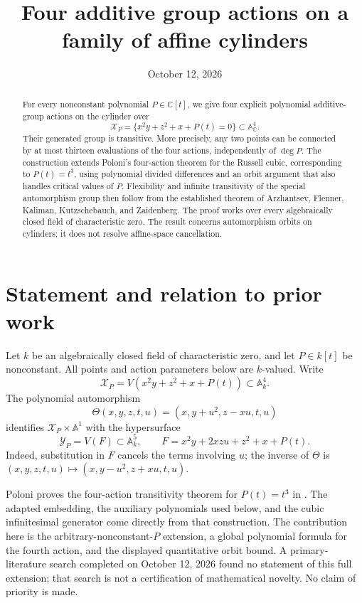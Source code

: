 \documentclass[11pt,letterpaper]{article}
\title{Four additive group actions on a family of affine cylinders}
\author{}
\date{October 12, 2026}
\newcommand{\A}{\mathbb A}
\newcommand{\C}{\mathbb C}
\newcommand{\Y}{\mathcal Y_P}
\newcommand{\X}{\mathcal X_P}
\theoremstyle{remark}
\begin{document}
\maketitle
\vspace{-0.4em}
\begin{abstract}
For every nonconstant polynomial $P\in\C[t]$, we give four explicit polynomial additive-group actions on the cylinder over
\[
\mathcal X_P=\{x^2y+z^2+x+P(t)=0\}\subset\A^4_{\C}.
\]
Their generated group is transitive. More precisely, any two points can be connected by at most thirteen evaluations of the four actions, independently of $\deg P$. The construction extends Poloni's four-action theorem for the Russell cubic, corresponding to $P(t)=t^3$, using polynomial divided differences and an orbit argument that also handles critical values of $P$. Flexibility and infinite transitivity of the special automorphism group then follow from the established theorem of Arzhantsev, Flenner, Kaliman, Kutzschebauch, and Zaidenberg. The proof works over every algebraically closed field of characteristic zero. The result concerns automorphism orbits on cylinders; it does not resolve affine-space cancellation.
\end{abstract}

\section{Statement and relation to prior work}

Let $k$ be an algebraically closed field of characteristic zero, and let $P\in k[t]$ be nonconstant. All points and action parameters below are $k$-valued. Write
\[
\X=V(x^2y+z^2+x+P(t))\subset\A^4_k.
\]
The polynomial automorphism
\begin{equation}\label{eq:theta}
\Theta(x,y,z,t,u)=(x,y+u^2,z-xu,t,u)
\end{equation}
identifies $\X\times\A^1$ with the hypersurface
\begin{equation}\label{eq:adapted}
\Y=V(F)\subset\A^5_k,\qquad
F=x^2y+2xzu+z^2+x+P(t).
\end{equation}
Indeed, substitution in $F$ cancels the terms involving $u$; the inverse of $\Theta$ is $(x,y,z,t,u)\mapsto(x,y-u^2,z+xu,t,u)$.

Poloni proves the four-action transitivity theorem for $P(t)=t^3$ in \cite[Theorem~1.4]{Poloni}. The adapted embedding, the auxiliary polynomials used below, and the cubic infinitesimal generator come directly from that construction. The contribution here is the arbitrary-nonconstant-$P$ extension, a global polynomial formula for the fourth action, and the displayed quantitative orbit bound. A primary-literature search completed on October 12, 2026 found no statement of this full extension; that search is not a certification of mathematical novelty. No claim of priority is made.
\end{document}
